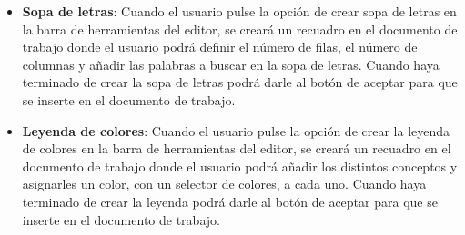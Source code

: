 \begin{itemize}
  \item \textbf{Sopa de letras}: Cuando el usuario pulse la opción de crear sopa de letras en la barra de herramientas del editor,
        se creará un recuadro en el documento de trabajo donde el usuario podrá definir el número de filas, el número de columnas y añadir las palabras a buscar en la sopa de letras. Cuando haya terminado de crear la sopa de letras podrá darle al botón de aceptar para que se inserte en el documento de trabajo.
  \item \textbf{Leyenda de colores}: Cuando el usuario pulse la opción de crear la leyenda de colores en la barra de herramientas del editor, se creará un recuadro en el documento de trabajo donde el usuario podrá añadir los distintos conceptos y asignarles un color, con un selector de colores, a cada uno. Cuando haya terminado de crear la leyenda podrá darle al botón de aceptar para que se inserte en el documento de trabajo.
\end{itemize}

